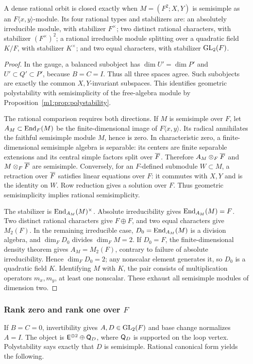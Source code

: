 \begin{proposition}\label{m1:prop:dense-closed}
A dense rational orbit is closed exactly when
$M=(F^2;X,Y)$ is semisimple as an $F\langle x,y\rangle$-module.
Its four rational types and stabilizers are: an absolutely irreducible
module, with stabilizer $F^\times$; two distinct rational characters,
with stabilizer $(F^\times)^2$; a rational irreducible module splitting
over a quadratic field $K/F$, with stabilizer $K^\times$; and two equal
characters, with stabilizer $\operatorname{GL}_2(F)$.
\end{proposition}
\begin{proof}
In the gauge, a balanced subobject has $\dim U'=\dim P'$ and
$U'\subset Q'\subset P'$, because $B=C=I$. Thus all three spaces agree.
Such subobjects are exactly the common $X,Y$-invariant subspaces.
This identifies geometric polystability with semisimplicity of the
free-algebra module by Proposition~\ref{m1:prop:polystability}.

The rational comparison requires both directions. If $M$ is semisimple
over $F$, let $A_M\subset\operatorname{End}_F(M)$ be the finite-dimensional image of
$F\langle x,y\rangle$. Its radical annihilates the faithful semisimple
module $M$, hence is zero. In characteristic zero, a finite-dimensional
semisimple algebra is separable: its centers are finite separable
extensions and its central simple factors split over $\overline F$. Therefore
$A_M\otimes_F\overline F$ and $M\otimes_F\overline F$ are semisimple. Conversely, for
an $F$-defined submodule $W\subset M$, a retraction over $\overline F$ satisfies
linear equations over $F$: it commutes with $X,Y$ and is the identity
on $W$. Row reduction gives a solution over $F$. Thus geometric
semisimplicity implies rational semisimplicity.

The stabilizer is $\operatorname{End}_{A_M}(M)^\times$. Absolute irreducibility gives
$\operatorname{End}_{A_M}(M)=F$. Two distinct rational characters give $F\oplus F$,
and two equal characters give $M_2(F)$. In the remaining irreducible
case, $D_0=\operatorname{End}_{A_M}(M)$ is a division algebra, and $\dim_FD_0$ divides
$\dim_FM=2$. If $D_0=F$, the finite-dimensional density theorem gives
$A_M=M_2(F)$, contrary to failure of absolute irreducibility. Hence
$\dim_FD_0=2$; any nonscalar element generates it, so $D_0$ is a
quadratic field $K$. Identifying $M$ with $K$, the pair consists of
multiplication operators $m_x,m_y$, at least one nonscalar. These exhaust
all semisimple modules of dimension two.
\end{proof}

\subsubsection{Rank zero and rank one over \texorpdfstring{$F$}{F}}
\label{m1:subsec:rational-boundary}
If $B=C=0$, invertibility gives $A,D\in\operatorname{GL}_2(F)$ and base change
normalizes $A=I$. The object is $\mathsf E^{\oplus2}\oplus\mathsf Q_D$, where
$\mathsf Q_D$ is supported on the loop vertex. Polystability says exactly
that $D$ is semisimple. Rational canonical form yields the following.

